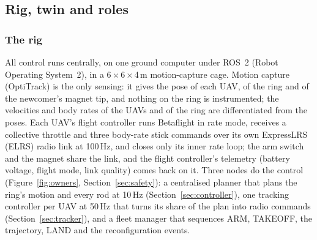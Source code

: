 
\subsection{Rig, twin and roles}
\label{sec:overview}

\subsubsection{The rig}
\label{sec:hardware}

All control runs centrally, on one ground computer under ROS~2 (Robot Operating System~2), in a
6\,$\times$\,6\,$\times$\,4\,m motion-capture cage. Motion capture (OptiTrack) is the only sensing: it gives the
pose of each UAV, of the ring and of the newcomer's magnet tip, and nothing on the ring is instrumented; the
velocities and body rates of the UAVs and of the ring are differentiated from the poses. Each UAV's flight
controller runs Betaflight in rate mode, receives a collective throttle and three body-rate stick commands over
its own ExpressLRS (ELRS) radio link at 100\,Hz, and closes only its inner rate loop; the arm switch and the
magnet share the link, and the flight controller's telemetry (battery voltage, flight mode, link quality) comes
back on it. Three nodes do the control (Figure~\ref{fig:owners}, Section~\ref{sec:safety}): a centralised planner
that plans the ring's motion and every rod at 10\,Hz (Section~\ref{sec:controller}), one tracking controller per
UAV at 50\,Hz that turns its share of the plan into radio commands (Section~\ref{sec:tracker}), and a fleet
manager that sequences ARM, TAKEOFF, the trajectory, LAND and the reconfiguration events.

